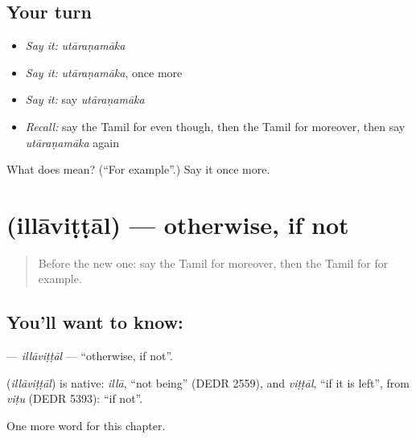 \subsection*{Your turn}
\begin{itemize}
\raggedright
  \item \emph{Say it:} \emph{utāraṇamāka}
  \item \emph{Say it:} \emph{utāraṇamāka}, once more
  \item \emph{Say it:} say \emph{utāraṇamāka}
  \item \emph{Recall:} say the Tamil for even though, then the Tamil for moreover, then say \emph{utāraṇamāka} again
\end{itemize}

\begin{tcolorbox}[breakable,colback=teal!4,colframe=teal!35!black,title={Before you move on}]
What does  mean? (\textquotedblleft{}For example\textquotedblright{}.) Say it once more.
\end{tcolorbox}
\section[\texorpdfstring{\ta{இல்லாவிட்டால்} (illāviṭṭāl)}{இல்லாவிட்டால் (illāviṭṭāl)}]{ (illāviṭṭāl) — otherwise, if not}

\label{lesson:TA-C176-illavittal}



\begin{quote}
Before the new one: say the Tamil for moreover, then the Tamil for for example.
\end{quote}

\subsection*{You'll want to know: }
\textbf{} — \emph{illāviṭṭāl} — \textquotedblleft{}otherwise, if not\textquotedblright{}.

\begin{cousinweb}
\textbf{} (\emph{illāviṭṭāl}) is native: \emph{illā}, \textquotedblleft{}not being\textquotedblright{} (DEDR 2559), and \emph{viṭṭāl}, \textquotedblleft{}if it is left\textquotedblright{}, from \emph{viṭu} (DEDR 5393): \textquotedblleft{}if not\textquotedblright{}.
\end{cousinweb}

\begin{grammarlens}[title={What you've built}]
One more word for this chapter.
\end{grammarlens}

